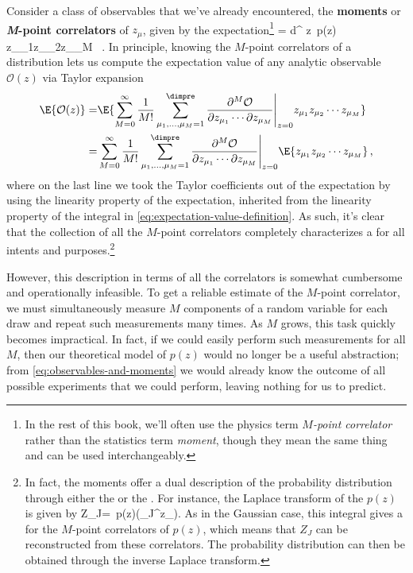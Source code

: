 Consider a
class of observables that we've already encountered, the  \textbf{moments} or \textbf{\emph{M}-point correlators} of $z_\mu$, given by the expectation\footnote{In the rest of this book, we'll often use the physics term \emph{$M$-point correlator} rather than the statistics term \emph{moment}, though they mean the same thing and can be used interchangeably.}
\be
{} = \int d^\dimpre\! z\ p(z)\, z_{\mu_{1}}z_{\mu_{2}}\cdots z_{\mu_{M}} \, .
\ee
In principle, knowing the $M$-point correlators of a distribution lets us compute the expectation value of any analytic observable $\mathcal{O}(z)$ via Taylor expansion
\begin{align}\label{eq:observables-and-moments}
\E{\mathcal{O}(z)}=&\E{\sum_{M=0}^{\infty}\frac{1}{M!}\sum_{\mu_1,\ldots,\mu_M=1}^{\dimpre}\frac{\partial^M \mathcal{O}}{\partial z_{\mu_1}\cdots\partial z_{\mu_M}}\Bigg\vert_{z=0} z_{\mu_{1}}z_{\mu_{2}}\cdots z_{\mu_{M}}}\, \\
=&\sum_{M=0}^{\infty}\frac{1}{M!}\sum_{\mu_1,\ldots,\mu_M=1}^{\dimpre}\frac{\partial^M \mathcal{O}}{\partial z_{\mu_1}\cdots\partial z_{\mu_M}}\Bigg\vert_{z=0}\E{ z_{\mu_{1}}z_{\mu_{2}}\cdots z_{\mu_{M}}}\, , \notag
\end{align}
where on the last line we took the Taylor coefficients out of the expectation by using the linearity property of the expectation, inherited from the linearity property of the integral in \eqref{eq:expectation-value-definition}. As such, it's clear that the collection of all the $M$-point correlators completely characterizes a  for all intents and purposes.\footnote{In fact, the moments offer a dual description of the probability distribution through either the  or the . For instance, the Laplace transform of the  $p(z)$ is given by
\be
Z_{J}\equiv{}=\int \le[\prod_{\mu}dz_{\mu}\ri]\ p(z)\exp\!\le(\sum_\mu J^\mu z_\mu\ri). 
\ee
As in the Gaussian case, this integral gives a  for the $M$-point correlators of $p(z)$, %
which means that $Z_{J}$ can be reconstructed from these correlators.
The probability distribution can then be obtained through the inverse Laplace transform. %
}



 

However, this description in terms of all the correlators is somewhat cumbersome and operationally infeasible. To get a reliable estimate of the $M$-point correlator, we must simultaneously measure $M$ components of a random variable for each draw and repeat such measurements many times.
As $M$ grows, this task quickly becomes impractical.
In fact, if we could easily perform such measurements for all $M$, then our theoretical model of $p(z)$ would no longer be a useful abstraction; from \eqref{eq:observables-and-moments} we would already know the outcome of all possible experiments that we could perform, leaving nothing for us to predict.

